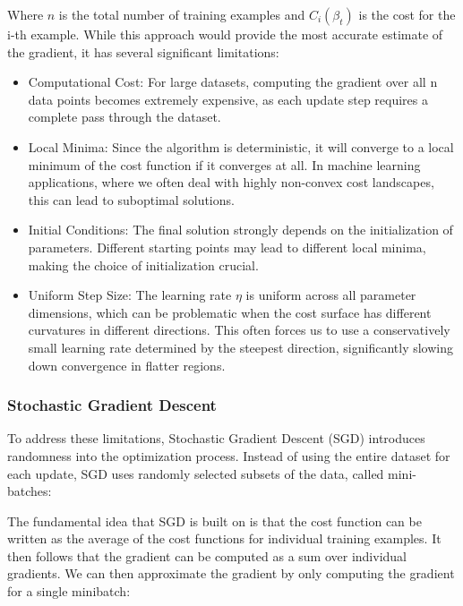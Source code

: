 \documentclass[aps,pra,english,notitlepage,reprint,nofootinbib]{revtex4-1}  %
\begin{document}
Where \( n\) is the total number of training examples and \( C_i(\beta_t) \) is the cost for the i-th example. While this approach would provide the most accurate estimate of the gradient, it has several significant limitations:
\begin{itemize}
    \item Computational Cost: For large datasets, computing the gradient over all n data points becomes extremely expensive, as each update step requires a complete pass through the dataset.
    \item Local Minima: Since the algorithm is deterministic, it will converge to a local minimum of the cost function if it converges at all. In machine learning applications, where we often deal with highly non-convex cost landscapes, this can lead to suboptimal solutions.
    \item Initial Conditions: The final solution strongly depends on the initialization of parameters. Different starting points may lead to different local minima, making the choice of initialization crucial.
    \item Uniform Step Size: The learning rate \( \eta \) is uniform across all parameter dimensions, which can be problematic when the cost surface has different curvatures in different directions. This often forces us to use a conservatively small learning rate determined by the steepest direction, significantly slowing down convergence in flatter regions.
\end{itemize}

\subsubsection{Stochastic Gradient Descent}

To address these limitations, Stochastic Gradient Descent (SGD) introduces randomness into the optimization process. Instead of using the entire dataset for each update, SGD uses randomly selected subsets of the data, called mini-batches:

The fundamental idea that SGD is built on is that the cost function can be written as the average of the cost functions for individual training examples. It then follows that the gradient can be computed as a sum over individual gradients. We can then approximate the gradient by only computing the gradient for a single minibatch:
\end{document}
